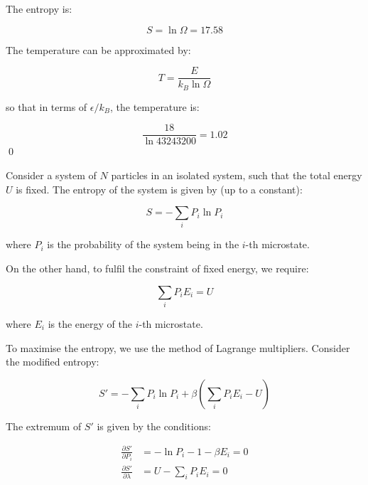 \documentclass[12pt]{article}
\begin{document}
The entropy is:

\begin{equation}
    S = \ln{\Omega} = 17.58
\end{equation}

The temperature can be approximated by:

\begin{equation}
    T = \frac{E}{k_{B}\ln{\Omega}}
\end{equation}

so that in terms of $\epsilon/k_{B}$, the temperature is:

\begin{equation}
    \frac{18}{\ln{43243200}} = 1.02
\end{equation}
\qed


Consider a system of $N$ particles in an isolated system, such that the total energy $U$ is fixed. The entropy of the system is given by (up to a constant):

\begin{equation}
    S = -\sum_{i} P_{i}\ln{P_{i}}
\end{equation}

where $P_{i}$ is the probability of the system being in the $i$-th microstate.

On the other hand, to fulfil the constraint of fixed energy, we require:

\begin{equation}
    \sum_{i} P_{i}E_{i} = U
\end{equation}

where $E_{i}$ is the energy of the $i$-th microstate.

To maximise the entropy, we use the method of Lagrange multipliers. Consider the modified entropy:

\begin{equation}
    S' = -\sum_{i} P_{i}\ln{P_{i}} + \beta\left( \sum_{i} P_{i}E_{i} - U \right)
\end{equation}

The extremum of $S'$ is given by the conditions:

\begin{equation}
    \begin{split}
        \frac{\partial S'}{\partial P_{i}} &= -\ln{P_{i}} - 1 - \beta E_{i} = 0 \\
        \frac{\partial S'}{\partial \lambda} &= U - \sum_{i} P_{i}E_{i} = 0
    \end{split}
\end{equation}
\end{document}
